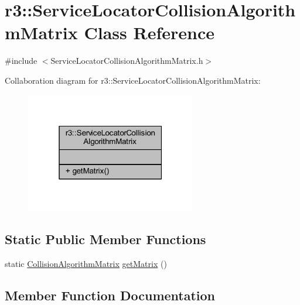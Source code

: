 \hypertarget{classr3_1_1_service_locator_collision_algorithm_matrix}{}\section{r3\+:\+:Service\+Locator\+Collision\+Algorithm\+Matrix Class Reference}
\label{classr3_1_1_service_locator_collision_algorithm_matrix}


{\ttfamily \#include $<$Service\+Locator\+Collision\+Algorithm\+Matrix.\+h$>$}



Collaboration diagram for r3\+:\+:Service\+Locator\+Collision\+Algorithm\+Matrix\+:\nopagebreak
\begin{figure}[H]
\begin{center}
\leavevmode
\includegraphics[width=211pt]{classr3_1_1_service_locator_collision_algorithm_matrix__coll__graph}
\end{center}
\end{figure}
\subsection*{Static Public Member Functions}
\begin{DoxyCompactItemize}
\item 
static \mbox{\hyperlink{classr3_1_1_collision_algorithm_matrix}{Collision\+Algorithm\+Matrix}} \mbox{\hyperlink{classr3_1_1_service_locator_collision_algorithm_matrix_a3616f828528161b552f5c3bc5dc6aa65}{get\+Matrix}} ()
\end{DoxyCompactItemize}


\subsection{Member Function Documentation}
\mbox{\label{classr3_1_1_service_locator_collision_algorithm_matrix_a3616f828528161b552f5c3bc5dc6aa65}} 

